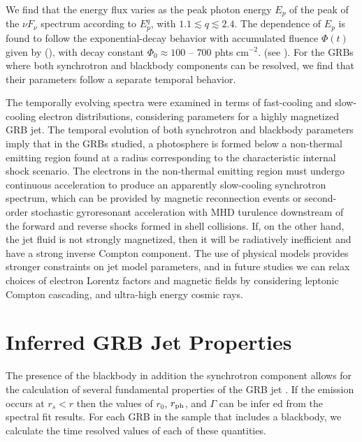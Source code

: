 We find that the energy flux varies as the peak photon energy $E_{p}$
of the peak of the $\nu F_\nu$ spectrum according to $E_{p}^q$, with
$1.1 \lesssim q \lesssim 2.4$.  The dependence of $E_{p}$ is found to
follow the exponential-decay behavior with accumulated fluence
$\Phi(t)$ given by (), with decay constant
$\Phi_0\approx 100$ -- $700$ phts cm$^{-2}$. (see ).
For the GRBs where both synchrotron and blackbody components can be
resolved, we find that their parameters follow a separate temporal
behavior.

The temporally evolving spectra were examined in terms of fast-cooling
and slow-cooling electron distributions, considering parameters for a
highly magnetized GRB jet.  The temporal evolution of both synchrotron
and blackbody parameters imply that in the GRBs studied, a photosphere
is formed below a non-thermal emitting region found at a radius
corresponding to the characteristic internal shock scenario.  The
electrons in the non-thermal emitting region must undergo continuous
acceleration to produce an apparently slow-cooling synchrotron
spectrum, which can be provided by magnetic reconnection events or
second-order stochastic gyroresonant acceleration with MHD turulence
downstream of the forward and reverse shocks formed in shell
collisions.  If, on the other hand, the jet fluid is not strongly
magnetized, then it will be radiatively inefficient and have a strong
inverse Compton component.  The use of physical models provides
stronger constraints on jet model parameters, and in future studies we
can relax choices of electron Lorentz factors and magnetic fields by
considering leptonic Compton cascading, and ultra-high energy cosmic
rays.











\section{Inferred GRB Jet Properties}
The presence of the blackbody in addition the synchrotron component
allows for the calculation of several fundamental properties of the
GRB jet \cite{Peer:2007}. If the emission occurs at $r_s<r$ then the values of
$r_0$, $r_{\rm ph}$, and $\Gamma$ can be infer ed from the spectral fit
results. For each GRB in the sample that includes a blackbody, we calculate the time resolved values of each of these quantities. 


